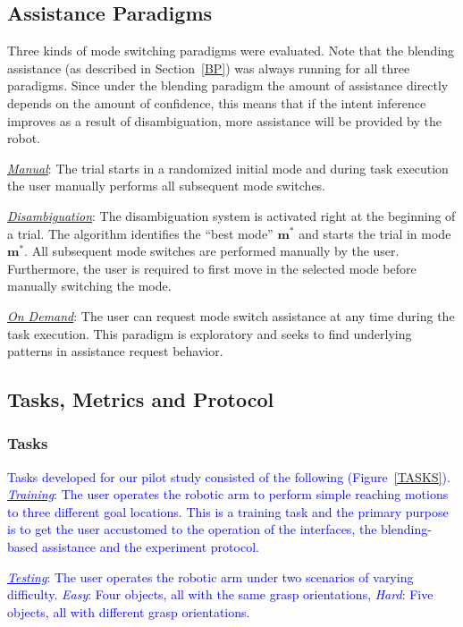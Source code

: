 \documentclass[conference]{IEEEtran}
\begin{document}
 \subsection{Assistance Paradigms}
 Three kinds of mode switching paradigms were evaluated. Note that the blending assistance (as described in Section~\ref{BP}) was always running for all three paradigms. Since under the blending paradigm the amount of assistance directly depends on the amount of confidence, this means that if the intent inference improves as a result of disambiguation, more assistance will be provided by the robot.
 
 \noindent\underline{\textit{Manual}}: The trial starts in a randomized initial mode and during task execution the user manually performs all subsequent mode switches.
 
 \noindent\underline{\textit{Disambiguation}}: The disambiguation system is activated right at the beginning of a trial. The algorithm identifies the ``best mode'' $\boldsymbol{m}^*$ and starts the trial in mode $\boldsymbol{m}^*$. All subsequent mode switches are performed manually by the user. Furthermore, the user is required to first move in the selected mode before manually switching the mode. 
 
 \noindent\underline{\textit{On Demand}}: The user can request mode switch assistance at any time during the task execution. This paradigm is exploratory and seeks to find underlying patterns in assistance request behavior.


\subsection{Tasks, Metrics and Protocol}
\subsubsection*{Tasks}
 \textcolor{blue}{Tasks developed for our pilot study consisted of the following (Figure~\ref{TASKS}).}
\textcolor{blue}{\noindent\underline{\textit{Training}}: The user operates the robotic arm to perform simple reaching motions to three different goal locations. This is a training task and the primary purpose is to get the user accustomed to the operation of the interfaces, the blending-based assistance and the experiment protocol. }

\textcolor{blue}{\noindent\underline{\textit{Testing}}: The user operates the robotic arm under two scenarios of varying difficulty. \textit{Easy}: Four objects, all with the same grasp orientations, \textit{Hard}: Five objects, all with different grasp orientations.}
\end{document}
